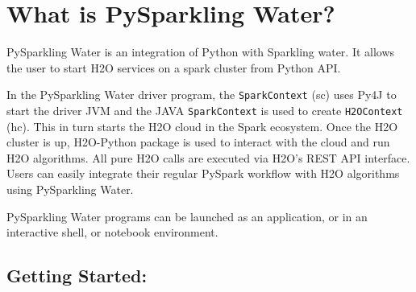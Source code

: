 \section{What is PySparkling Water?}

PySparkling Water is an integration of Python with Sparkling water. It allows the user to start H2O services on a spark cluster from Python API.

In the PySparkling Water driver program, the \texttt{SparkContext} (sc) uses Py4J to start the driver JVM and the JAVA \texttt{SparkContext} is used to create \texttt{H2OContext} (hc).  This in turn starts the H2O cloud in the Spark ecosystem. Once the H2O cluster is up, H2O-Python package is used to interact with the cloud and run H2O algorithms. All pure H2O calls are executed via H2O's REST API interface. Users can easily integrate their regular PySpark workflow with H2O algorithms using PySparkling Water.

PySparkling Water programs can be launched as an application, or in an interactive shell, or notebook environment.

\subsection{Getting Started:}

